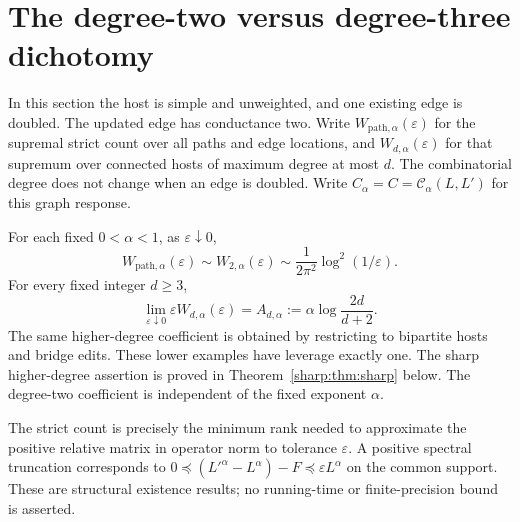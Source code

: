 \section{The degree-two versus degree-three dichotomy}\label{deg:sec:degree}
In this section the host is simple and unweighted, and one existing edge
is doubled. The updated edge has conductance two. Write
$W_{\mathrm{path},\alpha}(\varepsilon)$ for the supremal strict count over
all paths and edge locations, and $W_{d,\alpha}(\varepsilon)$ for that
supremum over connected hosts of maximum degree at most $d$.
The combinatorial degree does not change when an edge is doubled.
Write $C_\alpha=C=\mathcal C_\alpha(L,L')$ for this graph response.

\begin{theorem}\label{deg:thm:main}
For each fixed $0<\alpha<1$, as $\varepsilon\downarrow0$,
\[
 W_{\mathrm{path},\alpha}(\varepsilon)
 \sim W_{2,\alpha}(\varepsilon)
 \sim\frac1{2\pi^2}\log^2(1/\varepsilon).
\]
For every fixed integer $d\ge3$,
\[
 \lim_{\varepsilon\downarrow0}\varepsilon W_{d,\alpha}(\varepsilon)
 =A_{d,\alpha}:=\alpha\log\frac{2d}{d+2}.
\]
The same higher-degree coefficient is obtained by restricting to
bipartite hosts and bridge edits. These lower examples have leverage
exactly one. The sharp higher-degree assertion is proved in
Theorem~\ref{sharp:thm:sharp} below. The degree-two coefficient is
independent of the fixed exponent $\alpha$.
\end{theorem}

The strict count is precisely the minimum rank needed to approximate
the positive relative matrix in operator norm to tolerance
$\varepsilon$. A positive spectral truncation corresponds to
$0\preceq (L'^\alpha-L^\alpha)-F\preceq\varepsilon L^\alpha$
on the common support. These are structural existence results;
no running-time or finite-precision bound is asserted.

